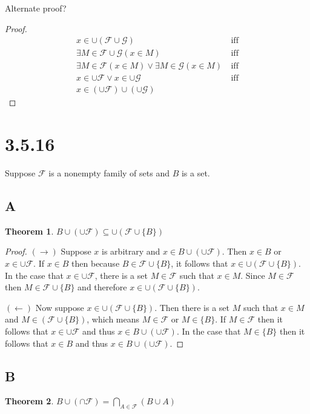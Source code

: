 \documentclass{article}
\newcommand{\F}{\mathcal{F}}
\newcommand{\G}{\mathcal{G}}
\newtheorem*{theorem}{Theorem}  %
\begin{document}
Alternate proof?
\begin{proof}
\begin{align*}
x \in \cup (\F \cup \G) ~ &\text{iff} \\
\exists M \in \F \cup \G (x \in M) ~ &\text{iff} \\
\exists M \in \F (x \in M) \lor \exists M \in \G (x \in M) ~ &\text{iff} \\
x \in \cup \F \lor x \in \cup \G ~ &\text{iff} \\
x \in (\cup \F) \cup (\cup \G)
\end{align*}
\end{proof}

\section*{3.5.16}
Suppose $\F$ is a nonempty family of sets and $B$ is a set.

\subsection*{A}
\begin{theorem} $B \cup (\cup \F) \subseteq \cup (\F \cup \{B\})$
\end{theorem}

\begin{proof}
$(\rightarrow)$ Suppose $x$ is arbitrary and $x \in B \cup (\cup \F)$. Then $x \in B$ or $x \in \cup \F$. If $x \in B$ then because $B \in \F \cup \{B\}$, it follows that $x \in \cup (\F \cup \{B\})$. In the case that $x \in \cup \F$, there is a set $M \in \F$ such that $x \in M$. Since $M \in \F$ then $M \in \F \cup \{B\}$ and therefore $x \in \cup (\F \cup \{B\})$.

$(\leftarrow)$ Now suppose $x \in \cup (\F \cup \{B\})$. Then there is a set $M$ such that $x \in M$ and $M \in (\F \cup \{B\})$, which means $M \in \F$ or $M \in \{B\}$. If $M \in \F$ then it follows that $x \in \cup \F$ and thus $x \in B \cup (\cup \F)$. In the case that $M \in \{B\}$ then it follows that $x \in B$ and thus $x \in B \cup (\cup \F)$.  
\end{proof}

\subsection*{B}
\begin{theorem} $B \cup (\cap \F) = \bigcap_{A \in \F} (B \cup A)$
\end{theorem}
\end{document}
